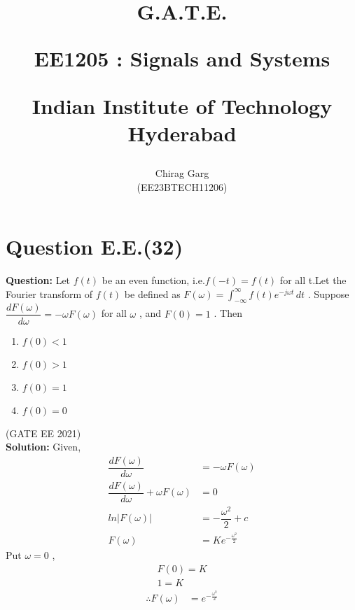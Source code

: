 \documentclass[journal,12pt,twocolumn]{IEEEtran}
\theoremstyle{remark}
\begin{document}
%






\title{
G.A.T.E.

\large{EE1205 : Signals and Systems}

Indian Institute of Technology Hyderabad
}
\author{Chirag Garg

(EE23BTECH11206)
}	





\maketitle

\newpage



\bigskip

\renewcommand{\thefigure}{\theenumi}
\renewcommand{\thetable}{\theenumi}


\section{Question E.E.(32)}
\vspace{0.5cm}



\textbf{Question:} 
Let $f(t)$ be an even function, i.e.$f(-t) = f(t)$ for all t.Let the Fourier transform of $f(t)$ be defined as $F(\omega) = \int_{-\infty}^{\infty} f(t) e^{-j \omega t} \, dt $ . Suppose $\dfrac{dF(\omega)}{d \omega} = -\omega F(\omega)$ for all $\omega$ , and $F(0) = 1$ . Then


\begin{enumerate}[label = (\Alph*)]
\item $f(0) < 1 $\\
\item  $f(0) > 1 $\\
\item  $f(0) = 1 $\\
\item   $f(0) = 0 $\\
\end{enumerate} \hfill{(GATE EE 2021)}\\
\textbf{Solution: }
Given, \begin{align}
\dfrac{dF(\omega)}{d \omega} &= -\omega F(\omega) \\
\dfrac{dF(\omega)}{d \omega} + \omega F(\omega) &= 0 \\
ln|F(\omega)| &= -\dfrac{\omega^{2}}{2} + c \\
F(\omega) &= Ke^{-\frac{\omega^2}{2}}
\end{align}
Put $\omega = 0$ , \begin{align}
F(0) = K \\
1 = K
\end{align}
\begin{align}
\therefore F(\omega) &= e^{-\frac{\omega^2}{2}}
\end{align}
\end{document}

